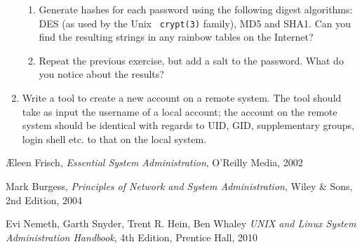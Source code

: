 \begin{enumerate}
\begin{enumerate}
\item
Generate hashes for each password using the following
digest algorithms: DES (as used by the Unix {\tt
crypt(3)} family),
MD5 and SHA1.  Can you find the
resulting strings in any rainbow tables on the
Internet?

\item
Repeat the previous exercise, but add a salt to the
password.  What do you notice about the results?
\end{enumerate}

\item
Write a tool to create a new account on a remote
system.  The tool should take as input the username of
a local account; the account on the remote system
should be identical with regards to UID, GID,
supplementary groups, login shell etc. to that on the
local system.
\end{enumerate}

\pagebreak


\begin{thebibliography}{99}

 \AE leen Frisch, {\em Essential System
Administration}, O'Reilly Media, 2002

Mark Burgess, {\em Principles of
Network and System Administration}, Wiley \& Sons, 2nd Edition, 2004

Evi Nemeth, Garth Snyder, Trent
R. Hein, Ben Whaley {\em UNIX and Linux System Administration Handbook},
4th Edition, Prentice Hall, 2010

\end{thebibliography}
